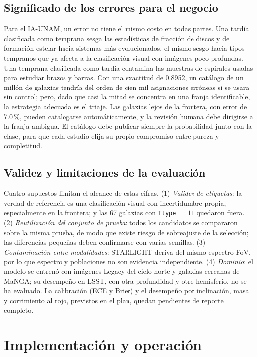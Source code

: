 \documentclass[letterpaper,11pt]{article}
\begin{document}
\subsection{Significado de los errores para el negocio}
Para el IA-UNAM, un error no tiene el mismo costo en todas partes. Una tardía clasificada como temprana sesga las estadísticas de fracción de discos y de formación estelar hacia sistemas más evolucionados, el mismo sesgo hacia tipos tempranos que ya afecta a la clasificación visual con imágenes poco profundas. Una temprana clasificada como tardía contamina las muestras de espirales usadas para estudiar brazos y barras. Con una exactitud de 0.8952, un catálogo de un millón de galaxias tendría del orden de cien mil asignaciones erróneas si se usara sin control; pero, dado que casi la mitad se concentra en una franja identificable, la estrategia adecuada es el triaje. Las galaxias lejos de la frontera, con error de 7.0\,\%, pueden catalogarse automáticamente, y la revisión humana debe dirigirse a la franja ambigua. El catálogo debe publicar siempre la probabilidad junto con la clase, para que cada estudio elija su propio compromiso entre pureza y completitud.

\subsection{Validez y limitaciones de la evaluación}
Cuatro supuestos limitan el alcance de estas cifras. (1) \emph{Validez de etiquetas}: la verdad de referencia es una clasificación visual con incertidumbre propia, especialmente en la frontera; y las 67 galaxias con \texttt{Ttype} $= 11$ quedaron fuera. (2) \emph{Reutilización del conjunto de prueba}: todos los candidatos se compararon sobre la misma prueba, de modo que existe riesgo de sobreajuste de la selección; las diferencias pequeñas deben confirmarse con varias semillas. (3) \emph{Contaminación entre modalidades}: STARLIGHT deriva del mismo espectro FoV, por lo que espectro y poblaciones no son evidencia independiente. (4) \emph{Dominio}: el modelo se entrenó con imágenes Legacy del cielo norte y galaxias cercanas de MaNGA; su desempeño en LSST, con otra profundidad y otro hemisferio, no se ha evaluado. La calibración (ECE y Brier) y el desempeño por inclinación, masa y corrimiento al rojo, previstos en el plan, quedan pendientes de reporte completo.

\section{Implementación y operación}
\end{document}
